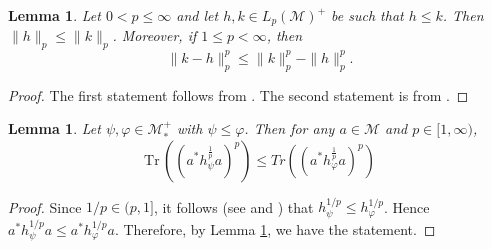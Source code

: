 \documentclass[12pt]{article}
\newtheorem{lemma}[theorem]{Lemma}
\theoremstyle{definition}
\theoremstyle{remark}
\numberwithin{equation}{section}
\def\Me{\mathcal M}
\def \Tr{\mathrm{Tr}\,}
\begin{document}
\begin{lemma}\label{lemma:order1} Let $0<p\le \infty$ and let $h,k\in L_p(\Me)^+$ be such
that $h\le k$. Then 
$\|h\|_p\le \|k\|_p$. Moreover, if $1\le p<\infty$, then 
\[
\|k-h\|_p^p\le \|k\|_p^p-\|h\|_p^p.
\]

\end{lemma}

\begin{proof} The first statement follows from \cite[Lemma 2.5 (iii) and  Lemma
4.8]{fack1986generalized}. The second statement is from \cite[Lemma
5.1]{fack1986generalized}.


\end{proof}


\begin{lemma}\label{lemma:order} Let $\psi,\varphi\in \Me_*^+$ with $\psi\le \varphi$.
Then for any $a\in \Me$ and $p\in [1,\infty)$,
\[
\Tr\left( (a^*h_\psi^{\frac1p}a)^p\right)\le Tr\left( (a^*h_\varphi^{\frac1p}a)^p\right)
\]


\end{lemma}

\begin{proof} Since $1/p\in (p,1]$, it follows (see \cite[Lemma B.7]{hiai2021quantum} and
\cite[Lemma 3.2]{hiai2021connections}) that $h_\psi^{1/p}\le h_\varphi^{1/p}$.  Hence $a^*h_\psi^{1/p}a\le a^*h_\varphi^{1/p}a$. 
Therefore, by Lemma \ref{lemma:order1}, 
we have the statement.

\end{proof}
\end{document}
